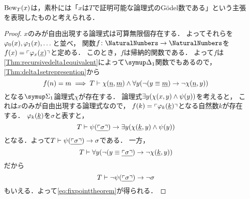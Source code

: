 \(\apply{\Bew_T}{x}\)は，素朴には「\(x\)は\(T\)で証明可能な論理式のGödel数である」という主張を表現したものと考えられる．


\begin{proof}
	\(x\)のみが自由出現する論理式は可算無限個存在する．
	よってそれらを\(\apply{\varphi_0}{x}, \apply{\varphi_1}{x}, \dots\)と並べ，
	関数\(f \colon \NaturalNumbers \to \NaturalNumbers\)を\(\apply{f}{x} = \GodelNumber{\apply{\varphi_x}{\numeral{x}}}\)と定める．
	このとき，\(f\)は帰納的関数である．
	よって\(f\)は\cref{Thm:recursivedelta1equivalent}によって\(\DeltaFormula_1\)関数でもあるので，
	\cref{Thm:delta1setrepresention}から
	\[
		\apply{f}{n} = m \metaimplies T \provable \apply{\chi}{\numeral{n}, \numeral{m}} \land \forall y \paren{\lnot \paren{y \objeq \numeral{m}} \to \lnot \apply{\chi}{\numeral{n}, y}}
	\]
	となる\(\SigmaFormula_1\)論理式\(\chi\)が存在する．
	論理式\(\exists y \paren{\apply{\chi}{x, y} \land \apply{\psi}{y}}\)を考えると，
	これは\(x\)のみが自由出現する論理式なので，
	\(\apply{f}{k} = \GodelNumber{\apply{\varphi_k}{\numeral{k}}}\)となる自然数\(k\)が存在する．
	\(\apply{\varphi_k}{\numeral{k}}\)を\(\sigma\)と表すと，
	\[
		T \provable \apply{\psi}{\numeral{\GodelNumber{\sigma}}} \to \exists y \paren{\apply{\chi}{\numeral{k}, y} \land \apply{\psi}{y}}
	\]
	となる．よって\(T \provable \apply{\psi}{\numeral{\GodelNumber{\sigma}}} \to \sigma\)である．
	一方，
	\[
		T \provable \forall y \paren{\lnot \paren{y \objeq \numeral{\GodelNumber{\sigma}}} \to \lnot \apply{\chi}{\numeral{k}, y}}
	\]
	だから
	\[
		T \provable \lnot \apply{\psi}{\numeral{\GodelNumber{\sigma}}} \to \lnot \sigma
	\]
	もいえる．よって\cref{eq:fixpointtheorem}が得られる．
\end{proof}


